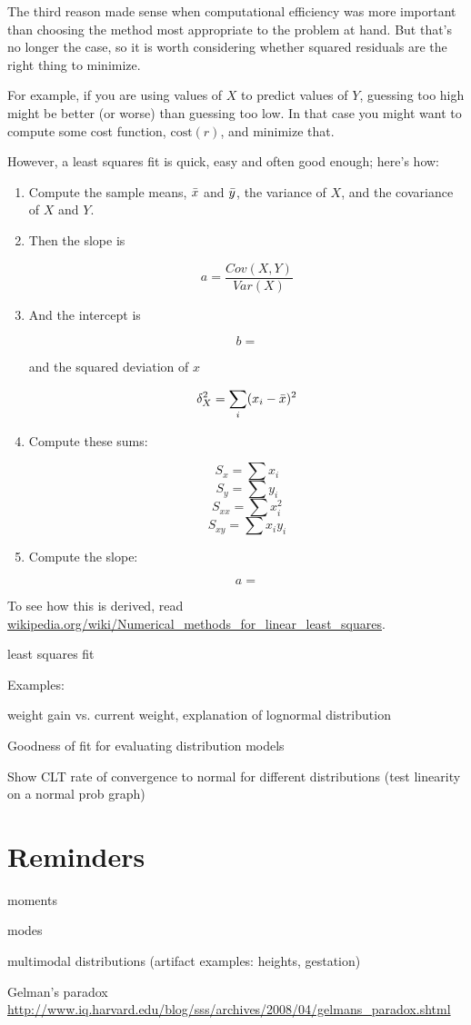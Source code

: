 \documentclass[12pt]{book}
\begin{document}
The third reason made sense when computational efficiency was more
important than choosing the method most appropriate to the problem
at hand.  But that's no longer the case, so it is worth considering
whether squared residuals are the right thing to minimize.

For example, if you are using values of $X$ to predict values of $Y$,
guessing too high might be better (or worse) than
guessing too low.  In that case you might want to compute some
cost function, $\mathrm{cost}(r)$, and minimize that.

However, a least squares fit is quick, easy and often good enough;
here's how:

\begin{enumerate}

\item Compute the sample means, $\bar{x}$ and $\bar{y}$, the variance
of $X$, and the covariance of $X$ and $Y$.

\item Then the slope is

\[ a = \frac{Cov(X,Y)}{Var(X)} \]

\item And the intercept is

\[ b = \]

and the squared
deviation of $x$

\[ \delta_X^2 = \sum_i (x_i - \bar{x})^2 \]

\item Compute these sums:

\[ S_x = \sum x_i \]
\[ S_y = \sum y_i \]
\[ S_{xx} = \sum x_i^2 \]
\[ S_{xy} = \sum x_i y_i \]

\item Compute the slope:

\[ a =   \]

\end{enumerate}

To see how this is derived, read
\url{wikipedia.org/wiki/Numerical_methods_for_linear_least_squares}.

least squares fit

Examples:

    weight gain vs. current weight, explanation of lognormal distribution

Goodness of fit for evaluating distribution models

Show CLT rate of convergence to normal for different distributions 
(test linearity on a normal prob graph)


\chapter{Reminders}

moments

modes

   multimodal distributions (artifact examples: heights, gestation)

Gelman's paradox
\url{http://www.iq.harvard.edu/blog/sss/archives/2008/04/gelmans_paradox.shtml}

\printindex

\clearemptydoublepage
\end{document}
